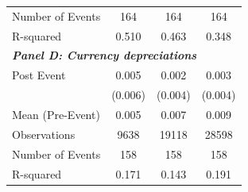 {\begin{tabular}{l*{3}{c}}
Number of Events&         164         &         164         &         164         \\
R-squared   &       0.510         &       0.463         &       0.348         \\
\bottomrule
\multicolumn{4}{l}{\textbf{\textit{Panel D: Currency depreciations}}} \\
Post Event  &       0.005         &       0.002         &       0.003         \\
&     (0.006)         &     (0.004)         &     (0.004)         \\
\midrule
Mean (Pre-Event)&       0.005         &       0.007         &       0.009         \\
Observations&        9638         &       19118         &       28598         \\
Number of Events&         158         &         158         &         158         \\
R-squared   &       0.171         &       0.143         &       0.191         \\
\bottomrule
\end{tabular}
}
